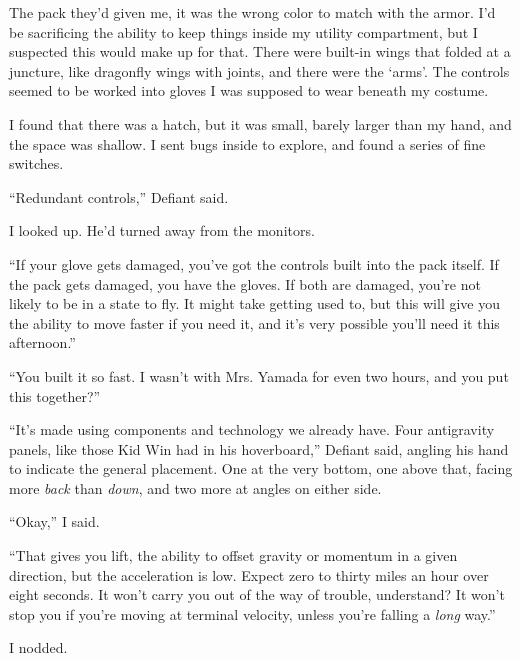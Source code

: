 The pack they'd given me, it was the wrong color to match with the armor.  I'd be sacrificing the ability to keep things inside my utility compartment, but I suspected this would make up for that.   There were built-in wings that folded at a juncture, like dragonfly wings with joints, and there were the `arms'.  The controls seemed to be worked into gloves I was supposed to wear beneath my costume.



I found that there was a hatch, but it was small, barely larger than my hand, and the space was shallow.  I sent bugs inside to explore, and found a series of fine switches.



``Redundant controls,'' Defiant said.



I looked up.  He'd turned away from the monitors.



``If your glove gets damaged, you've got the controls built into the pack itself.  If the pack gets damaged, you have the gloves.  If both are damaged, you're not likely to be in a state to fly.  It might take getting used to, but this will give you the ability to move faster if you need it, and it's very possible you'll need it this afternoon.''



``You built it so fast.  I wasn't with Mrs. Yamada for even two hours, and you put this together?''



``It's made using components and technology we already have.  Four antigravity panels, like those Kid Win had in his hoverboard,'' Defiant said, angling his hand to indicate the general placement.  One at the very bottom, one above that, facing more \emph{back} than \emph{down}, and two more at angles on either side.



``Okay,'' I said.



``That gives you lift, the ability to offset gravity or momentum in a given direction, but the acceleration is low.  Expect zero to thirty miles an hour over eight seconds.  It won't carry you out of the way of trouble, understand?  It won't stop you if you're moving at terminal velocity, unless you're falling a \emph{long} way.''



I nodded.



